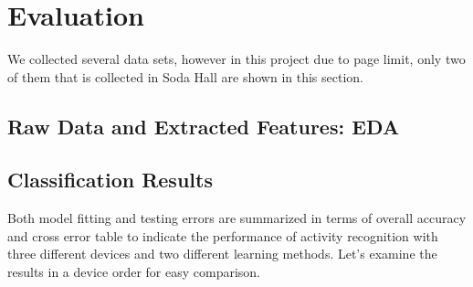 
\section{Evaluation}

We collected several data sets, however in this project due to page limit, only two of them that is collected in Soda Hall are shown in this section.

\label{sec:evaluation}

\subsection{Raw Data and Extracted Features: EDA}

\subsection{Classification Results}

Both model fitting and testing errors are summarized in terms of overall accuracy and cross error table to indicate the performance of activity recognition with three different devices and two different learning methods. Let's examine the results in a device order for easy comparison.

